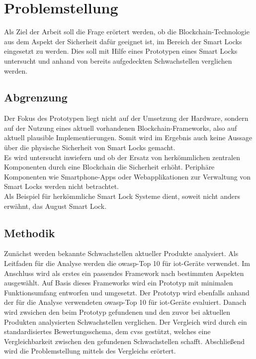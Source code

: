 \newpage
\section{Problemstellung}
\label{sec:problem}
    Als Ziel der Arbeit soll die Frage erörtert werden, ob die Block\-chain\--Tech\-no\-lo\-gie aus dem Aspekt der Sicherheit dafür geeignet ist, im Bereich der Smart Locks eingesetzt zu werden.
    Dies soll mit Hilfe eines Prototypen eines Smart Locks untersucht und anhand von bereits aufgedeckten Schwachstellen verglichen werden.
    
    \subsection{Abgrenzung}
    \label{sec:problem_limit}
		Der Fokus des Prototypen liegt nicht auf der Umsetzung der Hardware, sondern auf der Nutzung eines aktuell vorhandenen Blockchain-Frameworks, also auf aktuell plausible Implementierungen.
		Somit wird im Ergebnis auch keine Aussage über die physische Sicherheit von Smart Locks gemacht.
		\medskip\\
		Es wird untersucht inwiefern und ob der Ersatz von herkömmlichen zentralen Komponenten durch eine Blockchain die Sicherheit erhöht. 
		Periphäre Komponenten wie Smartphone-Apps oder Webapplikationen zur Verwaltung von Smart Locks werden nicht betrachtet.
		\medskip\\
		Als Beispiel für herkömmliche Smart Lock Systeme dient, soweit nicht anders erwähnt, das August Smart Lock.

    \subsection{Methodik}
    \label{sec:problem_methods}
        Zunächst werden bekannte Schwachstellen aktueller Produkte analysiert.
        Als Leitfaden für die Analyse werden die \gls{owasp}-Top 10 für  \gls{iot}-Geräte\cite{Miessler2015a} verwendet.
        Im Anschluss wird als erstes ein passendes Framework nach bestimmten Aspekten ausgewählt.
        Auf Basis dieses Frameworks wird ein Prototyp mit minimalen Funktionsumfang entworfen und umgesetzt.
        Der Prototyp wird ebenfalls anhand der für die Analyse verwendeten \gls{owasp}-Top 10 für \gls{iot}-Geräte evaluiert.
        Danach wird zwsichen den beim Prototyp gefundenen und den zuvor bei aktuellen Produkten analysierten Schwachstellen verglichen.
        Der Vergleich wird durch ein standardisiertes Bewertungsschema, dem \gls{cvss} gestützt, welches eine Vergleichbarkeit zwischen den gefundenen Schwachstellen schafft.
        Abschließend wird die Problemstellung mittels des Vergleichs erörtert.
  
